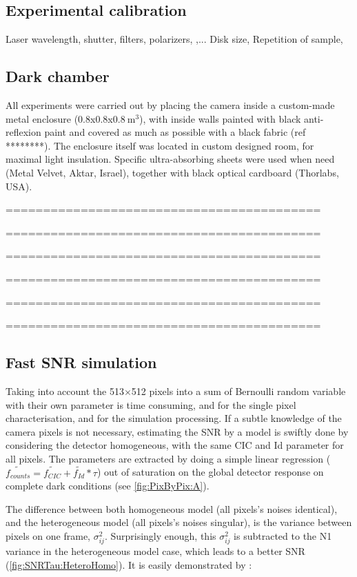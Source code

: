 \documentclass{article}
\begin{document}
\subsection*{Experimental calibration}
Laser wavelength, shutter, filters, polarizers, ,...
Disk size, Repetition of sample, 



\subsection*{Dark chamber}
All experiments were carried out by placing the camera inside a custom-made metal enclosure ($0.8$x$0.8$x$\SI{0.8}{\cubic\meter}$), with inside walls painted with black anti-reflexion paint and covered as much as possible with a black fabric (ref ********). 
The enclosure itself was located in custom designed room, for maximal light insulation.
Specific ultra-absorbing sheets were used when need (Metal Velvet, Aktar, Israel), together with black optical cardboard (Thorlabs, USA).  

==========================================

==========================================

==========================================

==========================================

==========================================

==========================================


\subsection{Fast SNR simulation}

Taking into account the 513$\times$512 pixels into a sum of Bernoulli random variable with their own parameter is time consuming, and for the single pixel characterisation, and for the simulation processing. 
If a subtle knowledge of the camera pixels is not necessary, estimating the SNR by a model is swiftly done by considering the detector homogeneous, with the same CIC and Id parameter for all pixels. The parameters are extracted by doing a simple linear regression ($\tilde{f_{counts}} = \tilde{f_{CIC}} + \tilde{f_{Id}}*\tau$) out of saturation on the global detector response on complete dark conditions (see \ref{fig:PixByPix:A}).\par
The difference between both homogeneous model (all pixels's noises identical), and the heterogeneous model (all pixels's noises singular), is the variance between pixels on one frame, $\sigma^2_{ij}$. Surprisingly enough, this $\sigma^2_{ij}$ is subtracted to the N1 variance in the heterogeneous model case, which leads to a better SNR (\ref{fig:SNRTau:HeteroHomo}). 
It is easily demonstrated by :   \par
\end{document}
